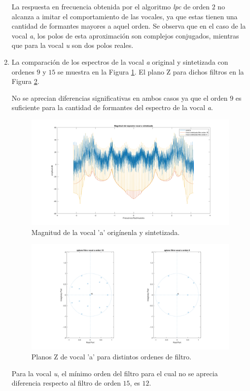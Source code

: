 \documentclass[letterpaper,onecolumn,10pt,journal,final]{IEEEtran}
\begin{document}
\begin{enumerate}[1)]
La respuesta en frecuencia obtenida por el algoritmo \textit{lpc} de orden $2$ no alcanza a imitar el comportamiento de las vocales, ya que estas tienen una cantidad de formantes mayores a aquel orden. 
Se observa que en el caso de la vocal \textit{a}, los polos de esta aproximación son complejos conjugados, mientras que para la vocal \textit{u} son dos polos reales. \\

\item %
La comparación de los espectros de la vocal \textit{a} original y sintetizada con ordenes $9$ y $15$ se muestra en la Figura \ref{P4_3M_a}. El plano Z para dichos filtros en la Figura \ref{P4_3Z_a}.

No se aprecian diferencias significativas en ambos casos ya que el orden $9$ es suficiente para la cantidad de formantes del espectro de la vocal \textit{a}.

%
\begin{figure}[H]
    \centering
    \includegraphics[width = 0.9 \linewidth]{Figuras/P4_3M_a.png}
    \caption{Magnitud de la vocal 'a' origínenla y sintetizada.}
    \label{P4_3M_a}
\end{figure}
%
\begin{figure}[H]
    \centering
    \includegraphics[width = 0.9 \linewidth]{Figuras/P4_3Z_a.png}
    \caption{Planos Z de vocal 'a' para distintos ordenes de filtro.}
    \label{P4_3Z_a}
\end{figure}
%
Para la vocal \textit{u}, el mínimo orden del filtro para el cual no se aprecia diferencia respecto al filtro de orden $15$, es $12$.


\end{enumerate}
\end{document}
